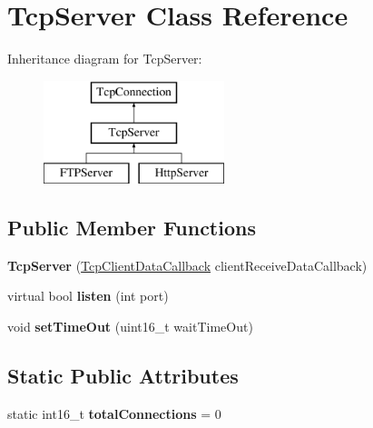 \hypertarget{class_tcp_server}{}\section{Tcp\+Server Class Reference}
\label{class_tcp_server}
Inheritance diagram for Tcp\+Server\+:\begin{figure}[H]
\begin{center}
\leavevmode
\includegraphics[height=3.000000cm]{class_tcp_server}
\end{center}
\end{figure}
\subsection*{Public Member Functions}
\begin{DoxyCompactItemize}
\item 
\hypertarget{class_tcp_server_a2348fbe62b583d5eb573eeb5f66d3ead}{}{\bfseries Tcp\+Server} (\hyperlink{class_delegate}{Tcp\+Client\+Data\+Callback} client\+Receive\+Data\+Callback)\label{class_tcp_server_a2348fbe62b583d5eb573eeb5f66d3ead}

\item 
\hypertarget{class_tcp_server_a24faa39c2af4ed06021ff6428b39f081}{}virtual bool {\bfseries listen} (int port)\label{class_tcp_server_a24faa39c2af4ed06021ff6428b39f081}

\item 
\hypertarget{class_tcp_server_a0e3bbe276368784e689155d2a7f4de52}{}void {\bfseries set\+Time\+Out} (uint16\+\_\+t wait\+Time\+Out)\label{class_tcp_server_a0e3bbe276368784e689155d2a7f4de52}

\end{DoxyCompactItemize}
\subsection*{Static Public Attributes}
\begin{DoxyCompactItemize}
\item 
\hypertarget{class_tcp_server_ac2eec338be91eafec77cd881499bd8a1}{}static int16\+\_\+t {\bfseries total\+Connections} = 0\label{class_tcp_server_ac2eec338be91eafec77cd881499bd8a1}

\end{DoxyCompactItemize}
